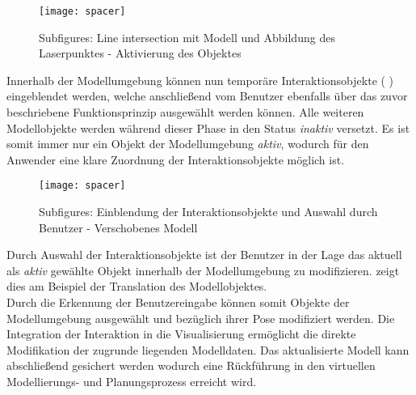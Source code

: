 \begin{figure}[!ht]
	\begin{center}
		\texttt{[image: spacer]}
		\caption{Subfigures: Line intersection mit Modell und Abbildung des Laserpunktes - Aktivierung des Objektes}
		\label{fig.intintersect}
	\end{center}
\end{figure} 

Innerhalb der Modellumgebung können nun temporäre Interaktionsobjekte ( \red[(a)]) eingeblendet werden, welche anschließend vom Benutzer ebenfalls über das zuvor beschriebene Funktionsprinzip ausgewählt werden können. Alle weiteren Modellobjekte werden während dieser Phase in den Status \textit{inaktiv} versetzt. Es ist somit immer nur ein Objekt der Modellumgebung \textit{aktiv}, wodurch für den Anwender eine klare Zuordnung der Interaktionsobjekte möglich ist.

\begin{figure}[!ht]
	\begin{center}
		\texttt{[image: spacer]}
		\caption{Subfigures: Einblendung der Interaktionsobjekte und Auswahl durch Benutzer - Verschobenes Modell}
		\label{fig.intarrows}
	\end{center}
\end{figure} 

Durch Auswahl der Interaktionsobjekte ist der Benutzer in der Lage das aktuell als \textit{aktiv} gewählte Objekt innerhalb der Modellumgebung zu modifizieren.  \red[(b)] zeigt dies am Beispiel der Translation des Modellobjektes. \\

Durch die Erkennung der Benutzereingabe können somit Objekte der Modellumgebung ausgewählt und bezüglich ihrer Pose modifiziert werden. Die Integration der Interaktion in die Visualisierung ermöglicht die direkte Modifikation der zugrunde liegenden Modelldaten. Das aktualisierte Modell kann abschließend gesichert werden wodurch eine Rückführung in den virtuellen Modellierungs- und Planungsprozess erreicht wird.



